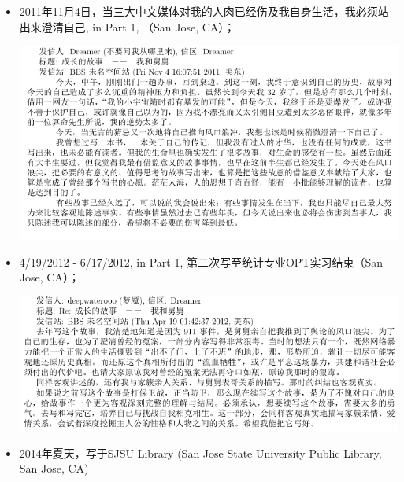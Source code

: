 \documentclass[9pt, b5paper]{article}
\begin{document}
\begin{itemize}
\item 2011年11月4日，当三大中文媒体对我的人肉已经伤及我自身生活，我必须站出来澄清自己, in Part 1, （San Jose, CA）；

\begin{center}
\includegraphics[width=.9\linewidth]{./pic/dreamer1.png}
\end{center}
\item 4/19/2012 - 6/17/2012, in Part 1, 第二次写至统计专业OPT实习结束（San Jose, CA）；

\begin{center}
\includegraphics[width=.9\linewidth]{./pic/dreamer2.png}
\end{center}
\item 2014年夏天，写于SJSU Library (San Jose State University Public Library, San Jose, CA)


\end{itemize}
\end{document}
